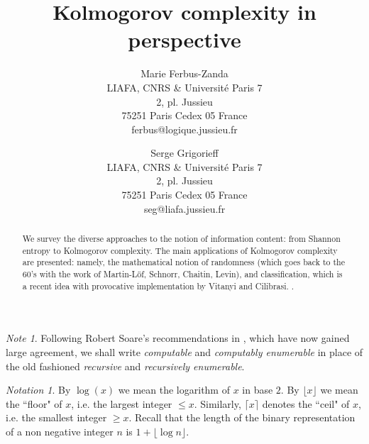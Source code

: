 
\usepackage{amsmath, amssymb, amsthm, latexsym}

\theoremstyle{plain}
\newtheorem{theorem}{Theorem}
\newtheorem{proposition}[theorem]{Proposition}
\newtheorem{corollary}[theorem]{Corollary}
\newtheorem{lemma}[theorem]{Lemma}
\newtheorem{claim}[theorem]{Claim}
\newtheorem{definition}[theorem]{Definition}
\newtheorem{notation}[theorem]{Notation}
\newtheorem*{theorem*}{Theorem}
\newtheorem*{corollary*}{Corollary}
\newtheorem*{lemma*}{Lemma}
\newtheorem*{claim*}{Claim}
\newtheorem{example}[theorem]{Example}
\theoremstyle{definition}
\newtheorem{convention}[theorem]{Convention}
\theoremstyle{remark}
\newtheorem{remark}[theorem]{Remark}
\newtheorem*{note*}{Note}
\newtheorem*{proposition*}{Proposition}
\newtheorem*{definition*}{Definition}
\newtheorem*{convention*}{Convention}
\newtheorem*{notation*}{Notation}
\newtheorem*{remark*}{Remark}
\newtheorem*{example*}{Example}
\title{Kolmogorov complexity in perspective}
\author{Marie Ferbus-Zanda\\
{\footnotesize LIAFA, CNRS \& Universit\'e Paris 7}\\
{\footnotesize 2, pl. Jussieu}\\
{\footnotesize 75251 Paris Cedex 05 France}\\
{\footnotesize ferbus@logique.jussieu.fr}
\and Serge Grigorieff\\
{\footnotesize LIAFA, CNRS \& Universit\'e Paris 7}\\
{\footnotesize 2, pl. Jussieu}\\
{\footnotesize 75251 Paris Cedex 05 France}\\
{\footnotesize seg@liafa.jussieu.fr}}

\maketitle
{\footnotesize\tableofcontents}
\normalsize
\begin{abstract}
We survey the diverse approaches to the notion of information
content: from Shannon entropy to Kolmogorov complexity.
The main applications of Kolmogorov complexity are presented:
namely, the mathematical notion of randomness
(which goes back to the 60's with the work of Martin-L\"of,
Schnorr, Chaitin, Levin),
and classification, which is a recent idea with provocative
implementation by Vitanyi and Cilibrasi.
.
\end{abstract}
\begin{note*}
Following Robert Soare's recommendations in \cite{soareBSL},
which have now gained large agreement, we shall write
{\em computable} and {\em computably enumerable}
in place of the old fashioned
{\em recursive} and {\em recursively enumerable}.
\end{note*}
\begin{notation*}
By $\log(x)$ we mean the logarithm of $x$ in base $2$.
By $\lfloor x\rfloor$ we mean the ``floor" of $x$,
i.e. the largest integer $\leq x$.
Similarly, $\lceil x\rceil$ denotes the ``ceil" of $x$,
i.e. the smallest integer $\geq x$.
Recall that the length of the binary representation of
a non negative integer $n$ is $1+\lfloor\log n\rfloor$.
\end{notation*}

